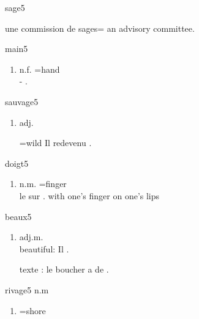 \documentclass[../templates/main.tex]{subfiles}
\begin{document}
\begin{french}
\begin{word}{sage}{}{5}
\begin{enumerate}[label=(\arabic*)]
			      une commission de sages= an advisory committee.
		\end{enumerate}
	\end{word}
	\begin{word}{main}{}{5}\label{wo:main}
		\begin{enumerate}[label=(\arabic*)]
			\item \begin{french}
				      n.f. =hand\\
				      -  .
			      \end{french}
		\end{enumerate}
	\end{word}
	\begin{word}{sauvage}{}{5}\label{wo:sauvage}
		\begin{enumerate}[label=(\arabic*)]
			\item adj. \begin{french}
				      =wild Il  redevenu .
			      \end{french}
		\end{enumerate}
	\end{word}
	\begin{word}{doigt}{}{5}\label{wo:doigt}
		\begin{enumerate}[label=(\arabic*)]
			\item n.m. =finger\\ le  sur  .
			      with one's finger on one's lips
		\end{enumerate}
	\end{word}
	\begin{word}{beaux}{}{5}\label{wo:beaux}
		\begin{enumerate}[label=(\arabic*)]
			\item adj.m.     \\
			      beautiful: Il   .\\
			\item [texte] :
			      le boucher a de   .
		\end{enumerate}
	\end{word}
	\begin{word}{rivage}{}{5}\label{wo:rivage}
		n.m
		\begin{enumerate}[label=(\arabic*)]
			\item =shore
		\end{enumerate}
	\end{word}
\end{french}
\end{document}
